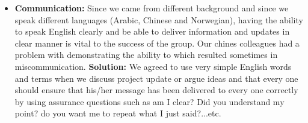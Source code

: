 \documentclass{article}
\begin{document}
\begin{itemize}
\item \textbf{Communication:} Since we came from different background and since we speak different languages (Arabic, Chinese and Norwegian), having the ability to speak English clearly and be able to deliver information and updates in clear manner is vital to the success of the group. Our chines colleagues had a problem with demonstrating the ability to which resulted sometimes in miscommunication. \textbf{Solution:} We agreed to use very simple English words and terms when we discuss project update or argue ideas and that every one should ensure that his/her message has been delivered to every one correctly by using assurance questions such as am I clear? Did you understand my point? do you want me to repeat what I just said?...etc.


\end{itemize}
\end{document}
